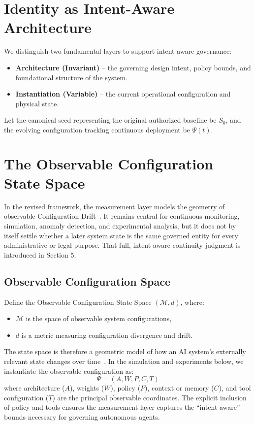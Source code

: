 \documentclass[11pt,a4paper]{article}
\begin{document}
\section{Identity as Intent-Aware Architecture}
We distinguish two fundamental layers to support intent-aware governance:
\begin{itemize}
    \item \textbf{Architecture (Invariant)} -- the governing design intent, policy bounds, and foundational structure of the system.
    \item \textbf{Instantiation (Variable)} -- the current operational configuration and physical state.
\end{itemize}
Let the canonical seed representing the original authorized baseline be \(S_{0}\), and the evolving configuration tracking continuous deployment be \(\Psi(t)\).

\section{The Observable Configuration State Space}
In the revised framework, the measurement layer models the geometry of observable Configuration Drift~\cite{lu2018}. It remains central for continuous monitoring, simulation, anomaly detection, and experimental analysis, but it does not by itself settle whether a later system state is the same governed entity for every administrative or legal purpose. That full, intent-aware continuity judgment is introduced in Section 5.

\subsection{Observable Configuration Space}
Define the Observable Configuration State Space \((\mathcal{M}, d)\), where:
\begin{itemize}
    \item \(\mathcal{M}\) is the space of observable system configurations,
    \item \(d\) is a metric measuring configuration divergence and drift.
\end{itemize}
The state space is therefore a geometric model of how an AI system's externally relevant state changes over time~\cite{rabanser2019}. In the simulation and experiments below, we instantiate the observable configuration as:
\begin{equation}
\Psi = (A, W, P, C, T)
\end{equation}
where architecture (\(A\)), weights (\(W\)), policy (\(P\)), context or memory (\(C\)), and tool configuration (\(T\)) are the principal observable coordinates. The explicit inclusion of policy and tools ensures the measurement layer captures the ``intent-aware'' bounds necessary for governing autonomous agents. 
\end{document}
